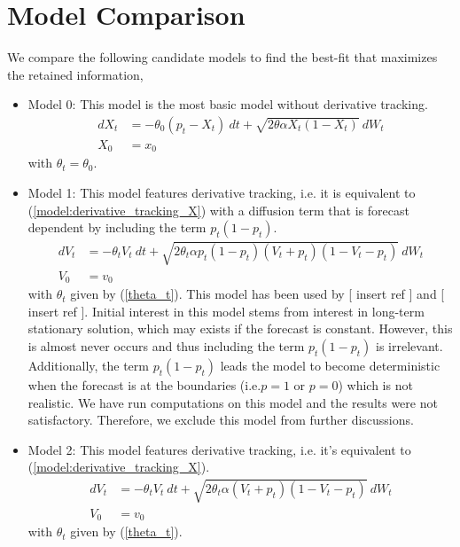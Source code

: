 \documentclass[10pt,twocolumn,letterpaper]{article}
\begin{document}
\section{Model Comparison} \label{Section_5}
We compare the following candidate models to find the best-fit that maximizes the retained information,
\begin{itemize}
  \item Model 0: This model is the most basic model without derivative tracking.
  \begin{equation}
  \begin{split}
  dX_t &=  - \theta_0 (p_t-X_t) \  dt + \sqrt{2 \theta \alpha X_t (1-X_t)} \  dW_t  \\ %
  X_0 & = x_0
\end{split}\label{M0}
  \end{equation}
  with $\theta_t= \theta_0 $.

  \item Model 1: This model features derivative tracking, i.e. it is equivalent to (\ref{model:derivative_tracking_X}) with a diffusion term that is forecast dependent by including the term $p_t(1-p_t)$.
  \begin{equation}
  \begin{split}
  dV_t &=  - \theta_t V_t \  dt + \sqrt{2 \theta_t \alpha p_t(1-p_t)(V_t +p_t ) (1-V_t-p_t)} \  dW_t  \\ %
  V_0 & = v_0
  \end{split}\label{M2}
  \end{equation}
  with $\theta_t$ given by (\ref{theta_t}). This model has been used by [ insert ref ] and [ insert ref ]. Initial interest in this model stems from interest in long-term stationary solution, which may exists  if the forecast is constant. However, this is almost never occurs and thus including the term $p_t(1-p_t)$ is irrelevant. Additionally, the term $p_t(1-p_t)$ leads the model to become deterministic when the forecast is at the boundaries (i.e.$p=1$ or $p=0$)  which is not realistic. We have run computations on this model and the results were not satisfactory. Therefore, we exclude this model from further discussions.
  
  \item Model 2: This model features derivative tracking, i.e. it's equivalent to (\ref{model:derivative_tracking_X}).
\begin{equation}
  \begin{split}
  dV_t &=  - \theta_t V_t \  dt + \sqrt{2 \theta_t \alpha (V_t +p_t ) (1-V_t-p_t)} \  dW_t  \\ %
  V_0 & = v_0
  \end{split}\label{M2}
  \end{equation}
  with $\theta_t$ given by (\ref{theta_t}).
\end{itemize}
\end{document}

